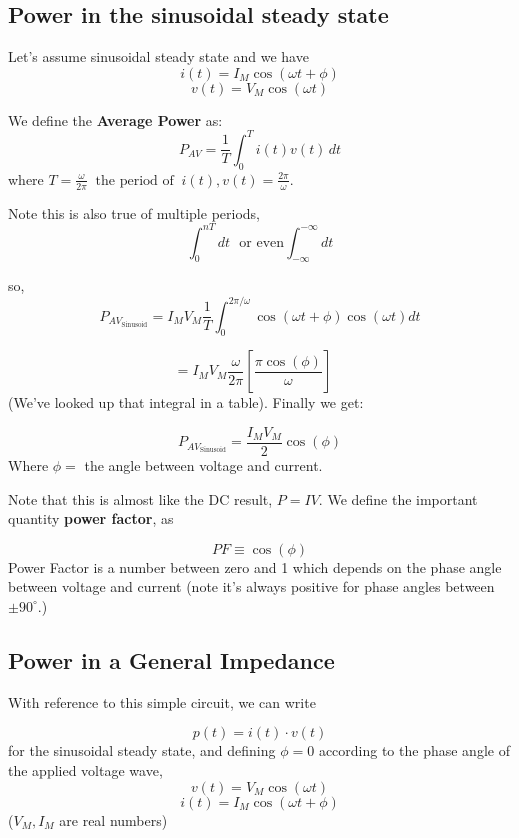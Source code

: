 \subsection{Power in the sinusoidal steady state}
Let's assume sinusoidal steady state and we have
\[
i(t) = I_M \cos(\omega t + \phi)
\]
\[
v(t) = V_M \cos(\omega t)
\]

\noindent We define the {\bf Average Power} as:
\[
P_{AV} = \frac{1}{T} \int_0^T i(t) v(t) \, dt
\]
where $T = \frac {\omega}  {2\pi}\;\; \text{the~period~of}  \;\; i(t), v(t) = \frac{2\pi}{\omega}$.


\noindent Note this is  also true of multiple periods,
\[
\int_0^{nT} dt \text{~~or~even} \int_{-\infty}^{-\infty}dt
\]



\noindent so,
\[
P_{AV_{\text{Sinusoid}}} = I_MV_M\frac{1}{T} \int_0^{2\pi/\omega}  \cos(\omega t + \phi) \cos(\omega t) dt
\]

\[
= I_M V_M \frac{\omega}{2\pi} \left[ \frac{\pi \cos(\phi)}{\omega} \right] \quad
\]
(We've looked up that integral in a table).   Finally we get:

\[
P_{AV_{\text{Sinusoid}}} = \frac{I_M V_M}{2} \cos(\phi)
\]
Where $ \phi = $ the angle between voltage and current.

Note that this is almost like the DC result, $P=IV$.   We
define the important quantity {\bf power factor}, as

\[
PF \equiv \cos(\phi)
\]
Power Factor is
a number between zero and 1 which depends on the phase angle between
voltage and current (note it's always positive for phase angles between
$\pm 90^\circ$.)


\subsection{Power in a General Impedance}

With reference to this simple circuit, we can write
%

\[
p(t) = i(t) \cdot v(t)
\]
for the sinusoidal steady state, and defining $\phi=0$ according
to the phase angle of the applied voltage wave,
\[
v(t) = V_M\cos(\omega t)
\]
\[
i(t) = I_M\cos(\omega t + \phi)
\]
($V_M, I_M$ are real numbers)


